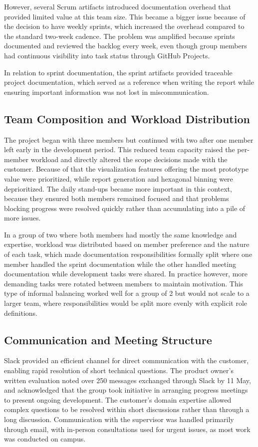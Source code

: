 However, several Scrum artifacts introduced documentation overhead that provided limited value at this team size. This became a bigger issue because of the decision to have weekly sprints, which increased the overhead compared to the standard two-week cadence. The problem was amplified because sprints documented and reviewed the backlog every week, even though group members had continuous visibility into task status through GitHub Projects.

In relation to sprint documentation, the sprint artifacts provided traceable project documentation, which served as a reference when writing the report while ensuring important information was not lost in miscommunication.

\subsection{Team Composition and Workload Distribution}

The project began with three members but continued with two after one member left early in the development period. This reduced team capacity raised the per-member workload and directly altered the scope decisions made with the customer. Because of that the visualization features offering the most prototype value were prioritized, while report generation and hexagonal binning were deprioritized. The daily stand-ups became more important in this context, because they ensured both members remained focused and that problems blocking progress were resolved quickly rather than accumulating into a pile of more issues.

In a group of two where both members had mostly the same knowledge and expertise, workload was distributed based on member preference and the nature of each task, which made documentation responsibilities formally split where one member handled the sprint documentation while the other handled meeting documentation while development tasks were shared. In practice however, more demanding tasks were rotated between members to maintain motivation. This type of informal balancing worked well for a group of 2 but would not scale to a larger team, where responsibilities would be split more evenly with explicit role definitions.

\subsection{Communication and Meeting Structure}

Slack provided an efficient channel for direct communication with the customer, enabling rapid resolution of short technical questions. The product owner's written evaluation noted over 250 messages exchanged through Slack by 11 May, and acknowledged that the group took initiative in arranging progress meetings to present ongoing development. The customer's domain expertise allowed complex questions to be resolved within short discussions rather than through a long discussion. Communication with the supervisor was handled primarily through email, with in-person consultations used for urgent issues, as most work was conducted on campus.

